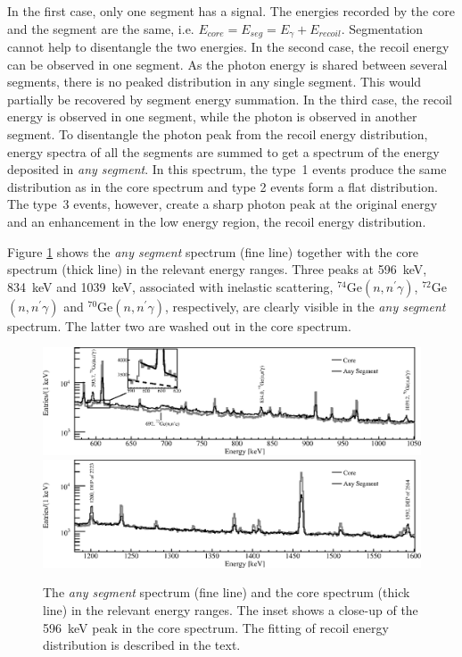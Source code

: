 \documentclass{elsart}
\begin{document}
In the first case, only one segment has a signal. The energies
recorded by the core and the segment are the same, i.e. $E_{core} =
E_{seg} = E_{\gamma} + E_{recoil}$. Segmentation cannot help to
disentangle the two energies. In the second case, the recoil energy
can be observed in one segment. As the photon energy is shared between
several segments, there is no peaked distribution in any single
segment. This would partially be recovered by segment energy
summation. In the third case, the recoil energy is observed in one
segment, while the photon is observed in another segment. To
disentangle the photon peak from the recoil energy distribution,
energy spectra of all the segments are summed to get a spectrum of the
energy deposited in \emph{any segment}. In this spectrum, the type~1
events produce the same distribution as in the core spectrum and type
2 events form a flat distribution. The type~3 events, however, create
a sharp photon peak at the original energy and an enhancement in the
low energy region, the recoil energy distribution.

Figure \ref{fig:cas} shows the \emph{any segment} spectrum (fine line)
together with the core spectrum (thick line) in the relevant energy
ranges. Three peaks at 596~keV, 834~keV and 1039~keV, associated with
inelastic scattering, $^{74}$Ge$(n, n^\prime\gamma)$, $^{72}$Ge$(n,
n^\prime\gamma)$ and $^{70}$Ge$(n, n^\prime\gamma)$, respectively, are
clearly visible in the \emph{any segment} spectrum. The latter two are
washed out in the core spectrum.

\begin{figure}[tbhp]
  \centering
  \includegraphics[width=\textwidth,clip]{spe_casp.eps}
  \includegraphics[width=\textwidth,clip]{spe_cas2p.eps}
  \caption{The \emph{any segment} spectrum (fine line) and the core
    spectrum (thick line) in the relevant energy ranges. The inset
    shows a close-up of the 596~keV peak in the core spectrum. The
    fitting of recoil energy distribution is described in the text.}
  \label{fig:cas}
\end{figure}
\end{document}
